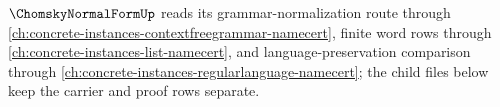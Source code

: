 $\ChomskyNormalFormUp$ reads its grammar-normalization route through \autoref{ch:concrete-instances-contextfreegrammar-namecert}, finite word rows through \autoref{ch:concrete-instances-list-namecert}, and language-preservation comparison through \autoref{ch:concrete-instances-regularlanguage-namecert}; the child files below keep the carrier and proof rows separate.


